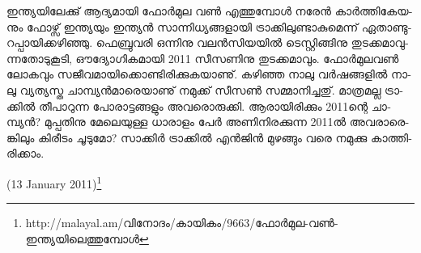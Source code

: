 ഇ­ന്ത്യ­യി­ലേ­ക്കു് ആദ്യ­മാ­യി ഫോര്‍­മുല വണ്‍ എത്തു­മ്പോള്‍ നരേന്‍ കാര്‍­ത്തി­കേ­യ­നും ഫോ­ഴ്സ് ഇന്ത്യ­യും ഇന്ത്യന്‍ 
സാ­ന്നി­ധ്യ­ങ്ങ­ളാ­യി ട്രാ­ക്കി­ലു­ണ്ടാ­കു­മെ­ന്ന് ഏതാ­ണ്ടു­റ­പ്പാ­യി­ക്ക­ഴി­ഞ്ഞു. ഫെ­ബ്രു­വ­രി ഒന്നി­നു വലന്‍­സി­യ­യില്‍ ടെ­സ്റ്റി­ങ്ങി­നു 
തു­ട­ക്ക­മാ­വു­ന്ന­തോ­ടു­കൂ­ടി, ഔദ്യോ­ഗി­ക­മാ­യി 2011 സീ­സ­ണി­നു തു­ട­ക്ക­മാ­വും. ഫോര്‍­മു­ല­വണ്‍ ലോ­ക­വും 
സജീ­വ­മാ­യി­ക്കൊ­ണ്ടി­രി­ക്കു­ക­യാ­ണു്. കഴി­ഞ്ഞ നാ­ലു വര്‍­ഷ­ങ്ങ­ളില്‍ നാ­ലു വ്യ­ത്യ­സ്ത ചാ­മ്പ്യന്‍­മാ­രെ­യാ­ണു് നമു­ക്ക് 
സീ­സണ്‍ സമ്മാ­നി­ച്ച­തു്. മാ­ത്ര­മ­ല്ല ട്രാ­ക്കില്‍ തീ­പാ­റു­ന്ന പോ­രാ­ട്ട­ങ്ങ­ളും അവ­രൊ­രു­ക്കി. ആരാ­യി­രി­ക്കും 2011­ന്റെ ചാ­മ്പ്യന്‍? 
മു­പ്പ­തി­നു മേ­ലെ­യു­ള്ള ധാ­രാ­ളം പേര്‍ അണി­നി­ര­ക്കു­ന്ന 2011ല്‍ അവ­രാ­രെ­ങ്കി­ലും കി­രീ­ടം ചൂ­ടു­മോ? സാ­ക്കിര്‍ ട്രാ­ക്കില്‍ 
എന്‍­ജിന്‍ മു­ഴ­ങ്ങും വരെ നമു­ക്കു കാ­ത്തി­രി­ക്കാം­.

(13 January 2011)\footnote{http://malayal.am/വിനോദം/കായികം/9663/ഫോര്‍മുല-വണ്‍-ഇന്ത്യയിലെത്തുമ്പോള്‍}

\newpage

